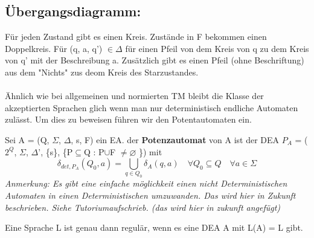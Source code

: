 {
    }


\subsection*{Übergangsdiagramm:}
Für jeden Zustand gibt es einen Kreis. Zustände in F bekommen einen Doppelkreis. Für (q, a, q') $\in \Delta$ für einen Pfeil von dem Kreis von q zu dem Kreis von q' mit der Beschreibung a. Zusätzlich gibt es einen Pfeil (ohne Beschriftung) aus dem "Nichts" zus deom Kreis des Starzustandes.\\\\
Ähnlich wie bei allgemeinen und normierten TM bleibt die Klasse der akzeptierten Sprachen glich wenn man nur deterministisch endliche Automaten zulässt. Um dies zu beweisen führen wir den Potentautomaten ein.

Sei A = (Q, $\Sigma$, $\Delta$, s, F) ein EA. der \textbf{Potenzautomat} von A ist der DEA $P_{A}$ = ($2^{Q}$, $\Sigma$, $\Delta$', \{s\}, \{P$\subseteq$Q : P$\cup$F $\neq \varnothing $ \}) mit \[\delta_{det, P_{A}}(Q_{0}, a) = \bigcup\limits_{q \in Q_0} \delta_A (q, a) \quad \forall Q_0 \subseteq Q \quad \forall a \in \Sigma \] 
\textit{Anmerkung: Es gibt eine einfache möglichkeit einen nicht Deterministischen Automaten in einen Deterministischen umzuwanden. Das wird hier in Zukunft beschrieben. Siehe Tutoriumaufschrieb. (das wird hier in zukunft angefügt)}

Eine Sprache L ist genau dann regulär, wenn es eine DEA A mit L(A) = L gibt. 

